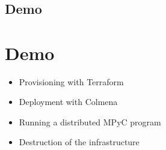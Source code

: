 \hypertarget{section}{%
\chapter{}\label{section}}

\section{Demo}

\hypertarget{demo}{%
\chapter{Demo}\label{demo}}

\begin{itemize}
\tightlist
\item
  Provisioning with Terraform
\item
  Deployment with Colmena
\item
  Running a distributed MPyC program
\item
  Destruction of the infrastructure
\end{itemize}
